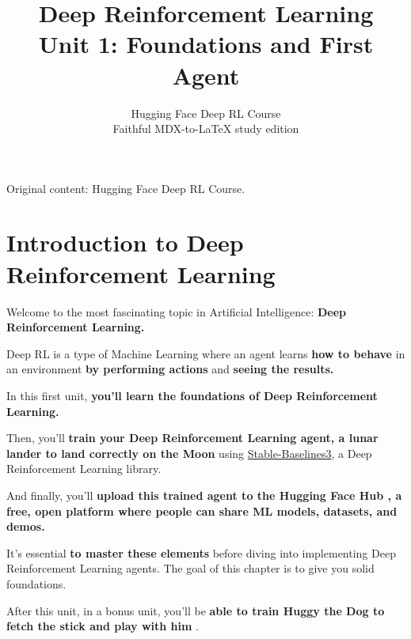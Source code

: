 \documentclass[11pt,a4paper]{article}
\title{\textbf{Deep Reinforcement Learning}\\[0.35em]\large Unit 1: Foundations and First Agent}
\author{Hugging Face Deep RL Course\\\small Faithful MDX-to-\LaTeX{} study edition}
\date{}
\begin{document}
\maketitle
\vspace{-0.8em}
\begin{center}\small\color{secondary}Original content: Hugging Face Deep RL Course.\end{center}
\tableofcontents
\vspace{1em}
\clearpage
\section{Introduction to Deep Reinforcement Learning}\label{introduction-to-deep-reinforcement-learning}


Welcome to the most fascinating topic in Artificial Intelligence: \textbf{Deep Reinforcement Learning.}

Deep RL is a type of Machine Learning where an agent learns \textbf{how to behave} in an environment \textbf{by performing actions} and \textbf{seeing the results.}

In this first unit, \textbf{you'll learn the foundations of Deep Reinforcement Learning.}

Then, you'll \textbf{train your Deep Reinforcement Learning agent, a lunar lander to land correctly on the Moon} using \href{https://stable-baselines3.readthedocs.io/en/master/}{Stable-Baselines3}, a Deep Reinforcement Learning library.


And finally, you'll \textbf{upload this trained agent to the Hugging Face Hub , a free, open platform where people can share ML models, datasets, and demos.}

It's essential \textbf{to master these elements} before diving into implementing Deep Reinforcement Learning agents. The goal of this chapter is to give you solid foundations.

After this unit, in a bonus unit, you'll be \textbf{able to train Huggy the Dog to fetch the stick and play with him }.
\end{document}
